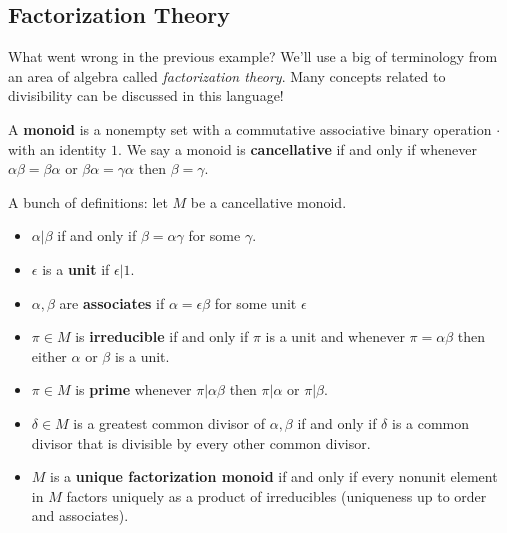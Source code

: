 \hypertarget{factorization-theory}{%
\subsection{Factorization Theory}\label{factorization-theory}}

What went wrong in the previous example? We'll use a big of terminology
from an area of algebra called \emph{factorization theory}. Many
concepts related to divisibility can be discussed in this language!

\begin{definition}[Monoid]

A \textbf{monoid} is a nonempty set with a commutative associative
binary operation \(\cdot\) with an identity \(1\). We say a monoid is
\textbf{cancellative} if and only if whenever
\(\alpha \beta= \beta \alpha\) or \(\beta \alpha = \gamma \alpha\) then
\(\beta = \gamma\).

\end{definition}

\begin{definition}

A bunch of definitions: let \(M\) be a cancellative monoid.

\begin{itemize}
\tightlist
\item
  \(\alpha\mathrel{\Big|}\beta\) if and only if \(\beta= \alpha \gamma\)
  for some \(\gamma\).
\item
  \(\epsilon\) is a \textbf{unit} if \(\epsilon\mathrel{\Big|}1\).
\item
  \(\alpha , \beta\) are \textbf{associates} if
  \(\alpha = \epsilon \beta\) for some unit \(\epsilon\)
\item
  \(\pi\in M\) is \textbf{irreducible} if and only if \(\pi\) is a unit
  and whenever \(\pi= \alpha \beta\) then either \(\alpha\) or \(\beta\)
  is a unit.
\item
  \(\pi \in M\) is \textbf{prime} whenever
  \(\pi\mathrel{\Big|}\alpha \beta\) then \(\pi\mathrel{\Big|}\alpha\)
  or \(\pi\mathrel{\Big|}\beta\).
\item
  \(\delta \in M\) is a greatest common divisor of \(\alpha, \beta\) if
  and only if \(\delta\) is a common divisor that is divisible by every
  other common divisor.
\item
  \(M\) is a \textbf{unique factorization monoid} if and only if every
  nonunit element in \(M\) factors uniquely as a product of irreducibles
  (uniqueness up to order and associates).
\end{itemize}

\end{definition}


